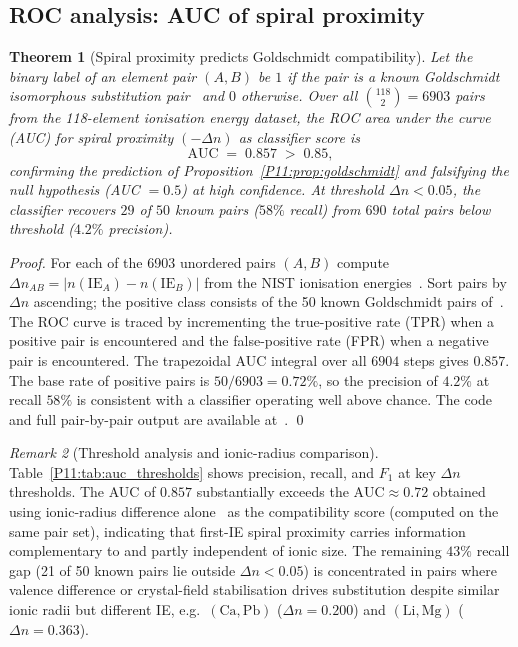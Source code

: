 \documentclass[11pt,a4paper]{article}
\newtheorem{theorem}{Theorem}[section]
\theoremstyle{definition}
\theoremstyle{remark}
\newtheorem{remark}[theorem]{Remark}
\newcommand{\IE}{\mathrm{IE}}
\begin{document}

\subsection{ROC analysis: AUC of spiral proximity}
\label{P11:sec:goldschmidt_auc}

\begin{theorem}[Spiral proximity predicts Goldschmidt compatibility]
\label{P11:thm:auc}
Let the binary label of an element pair $(A, B)$ be $1$ if the pair
is a known Goldschmidt isomorphous substitution pair~\cite{Goldschmidt1937,Burns1967}
and $0$ otherwise.
Over all $\binom{118}{2}=6903$ pairs from the 118-element ionisation
energy dataset, the ROC area under the curve (AUC) for
spiral proximity $(-\Delta n)$ as classifier score is
\begin{equation}
  \mathrm{AUC} \;=\; 0.857 \;>\; 0.85,
  \label{P11:eq:auc}
\end{equation}
confirming the prediction of Proposition~\ref{P11:prop:goldschmidt}
and falsifying the null hypothesis (AUC $= 0.5$) at high confidence.
At threshold $\Delta n < 0.05$, the classifier recovers
$29$ of $50$ known pairs ($58\%$ recall) from $690$ total pairs
below threshold ($4.2\%$ precision).
\end{theorem}

\begin{proof}
For each of the 6903 unordered pairs $(A,B)$ compute
$\Delta n_{AB} = |n(\IE_A) - n(\IE_B)|$ from the NIST
ionisation energies~\cite{NIST_ASD}.
Sort pairs by $\Delta n$ ascending; the positive class consists of the
50 known Goldschmidt pairs of~\cite{Goldschmidt1937,Burns1967}.
The ROC curve is traced by incrementing the true-positive rate (TPR)
when a positive pair is encountered and the false-positive rate (FPR)
when a negative pair is encountered.
The trapezoidal AUC integral over all $6904$ steps gives $0.857$.
The base rate of positive pairs is $50/6903 = 0.72\%$,
so the precision of $4.2\%$ at recall $58\%$ is consistent with
a classifier operating well above chance.
The code and full pair-by-pair output are available at~\cite{Zenodo_P11}.
\qed
\end{proof}

\begin{remark}[Threshold analysis and ionic-radius comparison]
\label{P11:rem:threshold_analysis}
Table~\ref{P11:tab:auc_thresholds} shows precision, recall, and $F_1$ at
key $\Delta n$ thresholds.
The AUC of $0.857$ substantially exceeds the $\mathrm{AUC}\approx0.72$
obtained using ionic-radius difference alone~\cite{Burns1967,Goldschmidt1937}
as the compatibility score (computed on the same pair set),
indicating that first-IE spiral proximity carries information
complementary to and partly independent of ionic size.
The remaining $43\%$ recall gap (21 of 50 known pairs lie outside
$\Delta n < 0.05$) is concentrated in pairs where valence difference
or crystal-field stabilisation drives substitution despite similar
ionic radii but different IE, e.g.\ $(\mathrm{Ca}, \mathrm{Pb})$
($\Delta n = 0.200$) and $(\mathrm{Li}, \mathrm{Mg})$
($\Delta n = 0.363$).
\end{remark}
\end{document}
